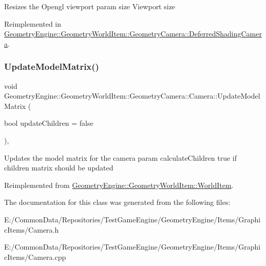 Resizes the Opengl viewport param size Viewport size 

Reimplemented in \mbox{\hyperlink{class_geometry_engine_1_1_geometry_world_item_1_1_geometry_camera_1_1_deferred_shading_camera_a16da38cfd723b755a63c372c08bbedf7}{Geometry\+Engine\+::\+Geometry\+World\+Item\+::\+Geometry\+Camera\+::\+Deferred\+Shading\+Camera}}.

\mbox{\label{class_geometry_engine_1_1_geometry_world_item_1_1_geometry_camera_1_1_camera_afe7145a1edb13ce3a50c2964f5c865e9}} 
\subsubsection{\texorpdfstring{UpdateModelMatrix()}{UpdateModelMatrix()}}
{\footnotesize\ttfamily void Geometry\+Engine\+::\+Geometry\+World\+Item\+::\+Geometry\+Camera\+::\+Camera\+::\+Update\+Model\+Matrix (\begin{DoxyParamCaption}\item[{bool}]{update\+Children = {\ttfamily false} }\end{DoxyParamCaption})\hspace{0.3cm}{\ttfamily [override]}, {\ttfamily [virtual]}}

Updates the model matrix for the camera param calculate\+Children true if children matrix should be updated 

Reimplemented from \mbox{\hyperlink{class_geometry_engine_1_1_geometry_world_item_1_1_world_item_a86effd24c41c87be8925ee3addd8c33d}{Geometry\+Engine\+::\+Geometry\+World\+Item\+::\+World\+Item}}.



The documentation for this class was generated from the following files\+:\begin{DoxyCompactItemize}
\item 
E\+:/\+Common\+Data/\+Repositories/\+Test\+Game\+Engine/\+Geometry\+Engine/\+Items/\+Graphic\+Items/Camera.\+h\item 
E\+:/\+Common\+Data/\+Repositories/\+Test\+Game\+Engine/\+Geometry\+Engine/\+Items/\+Graphic\+Items/Camera.\+cpp\end{DoxyCompactItemize}
